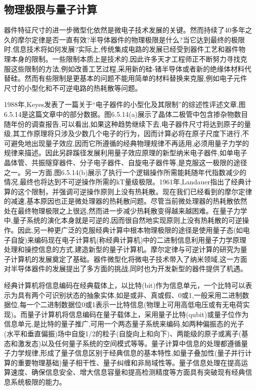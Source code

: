 \subsection{物理极限与量子计算}

器件特征尺寸的进一步微型化依然是微电子技术发展的关键。然而持续了40多年之久的摩尔定律是否一直有效?半导体器件的物理极限是什么?当它达到最终的极限时,信息技术将如何发展?实际上,传统集成电路的发展已经受到器件工艺和器件物理本身的限制。一些限制本质上是技术的,因此许多天才工程师正不断努力寻找克服这些限制的方法,例如改善工艺过程,采用新的硅-锗半导体或者新的绝缘体材料代替硅。然而有些限制是更基本的问题不能用简单的材料替换来克服,例如电子元件尺寸的小型化和不可逆电路的热耗散等问题。

1988年,Keyes发表了一篇关于“电子器件的小型化及其限制”的综述性评述文章,图6.5.14是这篇文章中的部分数据。图6.5.14(a)展示了晶体二极管中包含掺杂物数目随年份的调查报告,可以看出,如果这种趋势继续下去,电子器件尺寸将达到原子的量级,其工作原理将只涉及少数几个电子的行为，因而计算必将在原子尺度下进行,不可避免地出现量子效应,因而它所遵循的经典物理规律不再适用,必须用量子力学的规律来描述。因此另辟蹊径发展利用量子效应原理的新型纳米电子器件,如单电子晶体管、共振隧穿器件、分子电子器件、自旋电子器件等,是克服这一极限的途径之一。另一方面,图6.5.14(b)展示了执行一个逻辑操作所需能耗随年代指数减少的情况,最终也将达到不可逆操作所需的kT量级极限。1961年,Landauer指出了经典计算的这个限制，并强调可逆操作原则上没有热耗散。现在我们已经看到的摩尔定律的减速,基本原因也正是微处理器的热耗散问题。尽管当前微处理器的热耗散依然处在最终物理极限之上很远,然而进一步减少热耗散变得越来越困难。在量子力学中,量子系统的演化本身就是可逆的,因而很自然地实现原则上没有热耗散的可逆操作。因此,另一种更广泛的克服经典计算中根本物理极限的途径是使用量子态(如电子自旋)来编码现在电子计算机(称经典计算机)中的二进制信息利用量子力学原理处理和操控信息的方式,建造新型的量子计算机。摩尔定律与可逆计算的研究为量子计算机的发展奠定了基础。器件微型化将微电子技术带入了纳米领域,这一方面对半导体器件的发展提出了多方面的挑战,同时也为开发新型的器件提供了机遇。



经典计算机将信息编码在经典载体上，以比特(bit)作为信息单元，一个比特可以表示为具有两个可识别状态的抽象实体,如是或非、真或假、0或1,一般采用二进制数据位,每一个二进制数据位0或1表示一比特信息(物理上可用高低电压或有无电荷实现)。而量子计算机将信息编码在量子载体上，采用量子比特(qubit)或量子位作为信息单元,是比特的量子推广,可用一个两态量子系统来编码,如两种偏振态的光子(水平和垂直偏振)场中自旋1/2的粒子(自旋向上和向下)、两能级的原子或离子(基态和激发态)以及任何量子系统的空间模式等等。量子计算中信息的处理都遵循量子力学规律,形成了量子信息区别于经典信息的基本特性,如量子叠加性(量子并行计算的重要物理基础)量子相干性、量子纠缠和非局域性等。量子信息处理在提高运算速度、确保信息安全、增大信息容量和提高检测精度等方面具有突破现有经典信息系统极限的能力。

